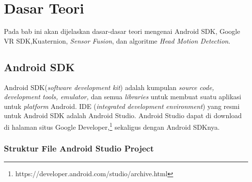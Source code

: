 \chapter{Dasar Teori}
\label{chap:dasar_teori}
Pada bab ini akan dijelaskan dasar-dasar teori mengenai Android SDK, Google VR SDK,Kuaternion, \textit{Sensor Fusion}, dan algoritme \textit{Head Motion Detection}.

\section{Android SDK}
\label{sec:android_sdk}

Android SDK(\textit{software development kit}) adalah kumpulan \textit{source code, development tools, emulator,} dan semua \textit{libraries} untuk membuat suatu aplikasi untuk \textit{platform} Android.\cite{developers2011android} IDE (\textit{integrated development environment}) yang resmi untuk Android SDK adalah Android Studio. Android Studio dapat di download di halaman situs Google Developer,\footnote{https://developer.android.com/studio/archive.html} sekaligus dengan Android SDKnya.  

\subsection{Struktur File Android Studio Project}

